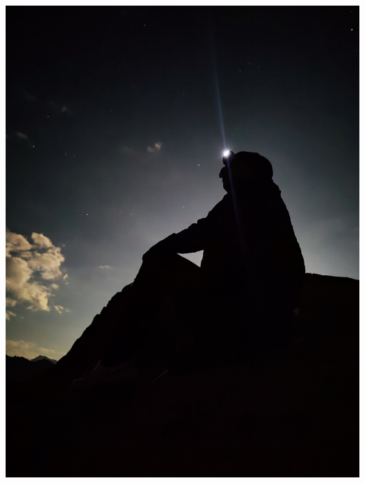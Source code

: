 \begin{frame}
{\begin{minipage}{\fourpicsize}
			\includegraphics[width=\textwidth]{../pics/IMG_20240819_205138}			
		\end{minipage}
		\vfill
	}
	\end{frame}